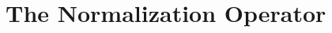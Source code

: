 


\section{The Normalization Operator}\label{sec:normOp}


\begin{comment}
In this section, we wish to character the (reverse) differential of the normalization operator $N:\R^{n\times N}\to\R^{n\times N}$ given in coordinates by
$$N:x^i_j\mapsto \frac{x^i_j-\E[x^i]}{\sqrt{\V[x^i]+\epsilon}}.$$
First, let's rewrite this without coordinates
\begin{align*}
	N(x)&=(\V[x]+\vec{\epsilon})^{\odot-\frac{1}{2}}\vec{1}^T\odot(x-\E[x]\vec{1}^T)\\
	&=:f(x)\odot g(x).
\end{align*}
Now, let's fix $(x,\xi)\in T\R^{n\times N}$, and we immediately see that the Hadamard product obeys the Leibniz Rule with exterior differentiation, i.e.,
$$dN_x(\xi)=g(x)\odot df_x(\xi)+f(x)\odot dg_x(\xi),$$
so we consider these computations separately.  Moreover, we now need to compute the derivative of the expectation $\E$ and variance $\V$ operators.

\begin{enumerate}
	\item For the expectation of a random vector, $\E:\R^{n\times N}\to\R^n$, we first rewrite $\E$ as follows
	\begin{align*}
		\E[x]&=\sum_{i=1}^n\left(\frac{1}{N}\sum_{j=1}^Nx^i_j\right)e_i\\
		&=\frac{1}{N}x\cdot\vec{1}\\
		&=\frac{1}{N}R_{\vec{1}}(x)
	\end{align*}
	where $\vec{1}=(1,1,...,1)\in\R^N$.  This is clearly linear, so for $(x,\xi)\in T\R^{n\times N}$, we have that
	\begin{align*}
		d\E_x(\xi)&=\E[\xi]\\
		&=\frac{1}{N}R_{\vec{1}}(\xi).
	\end{align*}
	For a fixed $x\in\R^{n\times N}$, we let $\mu:=\E[x]\in\R^n$ denote the output.
	
	\item For the variance of a random vector, $\V:\R^{n\times N}\to\R^n$, we rewrite $\V$ as follows
	\begin{align*}
		\V[x]&=\sum_{i=1}^n\left(\frac{1}{N}\sum_{j=1}^N(x^i_j-\mu^i)^2\right)e_i\\
		&=\E\left[(x-\mu\vec{1}^T)\odot(x-\mu\vec{1}^T)\right]\\
		&=\E\left[(x-\mu\vec{1}^T)^{\odot2}\right].
	\end{align*}
	From the first calculation, we know how to compute the derivative of $\E$, so we focus on the input $(x-\mu\vec{1}^T)^{\odot2}$.  
	

\end{comment}
